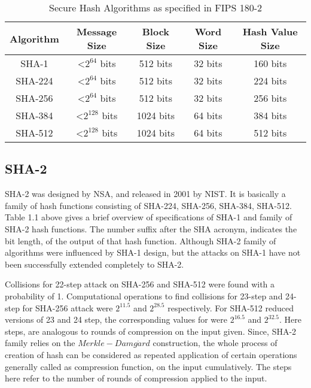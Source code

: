   \begin{table}[h]
    \begin{center}
    \begin{tabular}{ *{5}{c} }
      \hline
      Algorithm & Message Size & Block Size & Word Size & Hash Value Size \\ \hline \hline
      SHA-1   & \textless $2^{64}$  bits & 512  bits & 32 bits & 160 bits \\   
      SHA-224 & \textless $2^{64}$  bits & 512  bits & 32 bits & 224 bits \\   
      SHA-256 & \textless $2^{64}$  bits & 512  bits & 32 bits & 256 bits \\   
      SHA-384 & \textless $2^{128}$ bits & 1024 bits & 64 bits & 384 bits \\   
      SHA-512 & \textless $2^{128}$ bits & 1024 bits & 64 bits & 512 bits \\
      \hline
    \end{tabular}
    \caption{ Secure Hash Algorithms as specified in FIPS 180-2} 
  \end{center}
  \end{table}

  \subsection{SHA-2}

  SHA-2 was designed by NSA, and released in 2001 by NIST. It is basically a family of hash functions 
  consisting of SHA-224, SHA-256, SHA-384, SHA-512. Table 1.1 above gives a brief overview of specifications
  of SHA-1 and family of SHA-2 hash functions. The number suffix after the SHA acronym, 
  indicates the bit length, of the output of that hash function. Although SHA-2 family of algorithms
  were influenced by SHA-1 design, but the attacks on SHA-1 have not been successfully extended completely
  to SHA-2.

  Collisions for 22-step attack on SHA-256 and SHA-512 were found with a probability of 1. Computational
  operations to find collisions for 23-step and 24-step for SHA-256 attack were $2^{11.5}$ and $2^{28.5}$ 
  respectively. For SHA-512 reduced versions of 23 and 24 step, the corresponding values for were 
  $2^{16.5}$ and $2^{32.5}$.\cite{00012} Here steps, are analogous to rounds of compression
  on the input given. Since, SHA-2 family relies on the $Merkle-Damg\dot{a}rd$ construction, the whole
  process of creation of hash can be considered as repeated application of certain operations generally called
  as compression function, on the input cumulatively. The steps here refer to the number of rounds of
  compression applied to the input.

